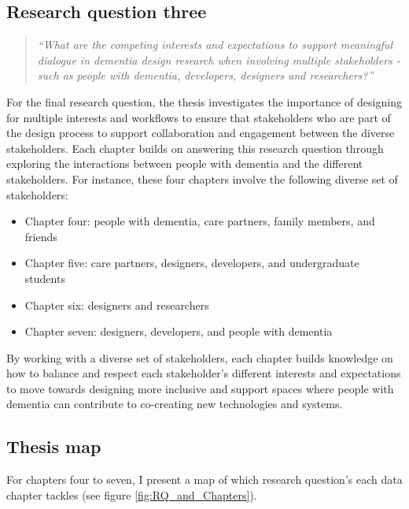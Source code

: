 \subsection{Research question three}
\label{RQ3}
\begin{quote}
\textit{``What are the competing interests and expectations to support meaningful dialogue in dementia design research when involving multiple stakeholders - such as people with dementia, developers, designers and researchers?''}
\end{quote}
For the final research question, the thesis investigates the importance of designing for multiple interests and workflows to ensure that stakeholders who are part of the design process to support collaboration and engagement between the diverse stakeholders. Each chapter builds on answering this research question through exploring the interactions between people with dementia and the different stakeholders. For instance, these four chapters involve the following diverse set of stakeholders:
\begin{itemize}
\item Chapter four: people with dementia, care partners, family members, and friends
\item Chapter five: care partners, designers, developers, and undergraduate students
\item Chapter six: designers and researchers
\item Chapter seven: designers, developers, and people with dementia
\end{itemize}

By working with a diverse set of stakeholders, each chapter builds knowledge on how to balance and respect each stakeholder's different interests and expectations to move towards designing more inclusive and support spaces where people with dementia can contribute to co-creating new technologies and systems.

\newpage
\subsection{Thesis map}
For chapters four to seven, I present a map of which research question's each data chapter tackles (see figure \ref{fig:RQ_and_Chapters}).

